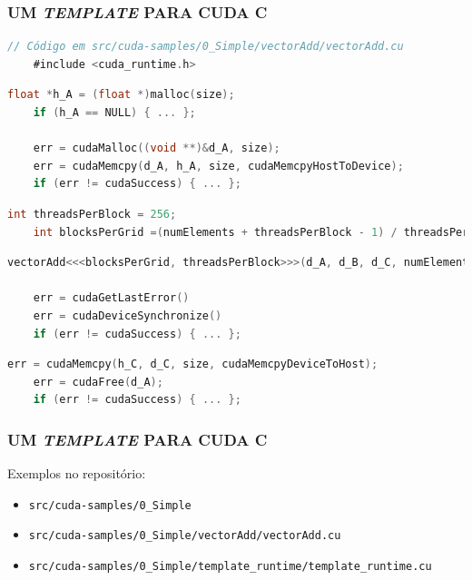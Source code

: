 \documentclass[10pt, compress]{beamer}
\begin{document}
\begin{frame}[fragile]
    \frametitle{UM \textit{TEMPLATE} PARA CUDA C}
    \begin{lstlisting}[basicstyle=\scriptsize, language=C]
    // Código em src/cuda-samples/0_Simple/vectorAdd/vectorAdd.cu 
    #include <cuda_runtime.h>
    \end{lstlisting}
    \pause
    \begin{lstlisting}[basicstyle=\scriptsize, language=C]
    float *h_A = (float *)malloc(size);
    if (h_A == NULL) { ... };

    err = cudaMalloc((void **)&d_A, size);
    err = cudaMemcpy(d_A, h_A, size, cudaMemcpyHostToDevice);
    if (err != cudaSuccess) { ... };
    \end{lstlisting}
    \pause
    \begin{lstlisting}[basicstyle=\scriptsize, language=C]
    int threadsPerBlock = 256;
    int blocksPerGrid =(numElements + threadsPerBlock - 1) / threadsPerBlock;
    \end{lstlisting}
    \pause
    \begin{lstlisting}[basicstyle=\scriptsize, language=C]
    vectorAdd<<<blocksPerGrid, threadsPerBlock>>>(d_A, d_B, d_C, numElements);

    err = cudaGetLastError()
    err = cudaDeviceSynchronize()
    if (err != cudaSuccess) { ... };
    \end{lstlisting}
    \pause
    \begin{lstlisting}[basicstyle=\scriptsize, language=C]
    err = cudaMemcpy(h_C, d_C, size, cudaMemcpyDeviceToHost);
    err = cudaFree(d_A);
    if (err != cudaSuccess) { ... };
    \end{lstlisting}
\end{frame}

\begin{frame}
    \frametitle{UM \textit{TEMPLATE} PARA CUDA C}
    Exemplos no repositório:
    \small
    \begin{itemize}
        \item \texttt{src/cuda-samples/0\_Simple}
        \item \texttt{src/cuda-samples/0\_Simple/vectorAdd/vectorAdd.cu}
        \item \texttt{src/cuda-samples/0\_Simple/template\_runtime/template\_runtime.cu}
    \end{itemize}
\end{frame}
\end{document}
